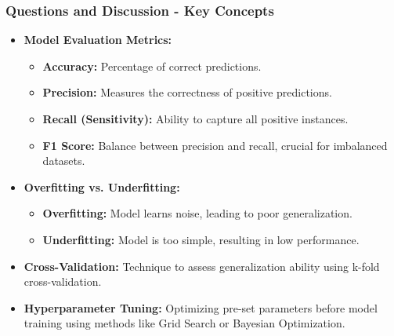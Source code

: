 \documentclass[aspectratio=169]{beamer}
\begin{document}
\begin{frame}[fragile]
  \frametitle{Questions and Discussion - Key Concepts}
  \begin{itemize}
    \item \textbf{Model Evaluation Metrics:}
      \begin{itemize}
        \item \textbf{Accuracy:} Percentage of correct predictions.
        \item \textbf{Precision:} Measures the correctness of positive predictions.
        \item \textbf{Recall (Sensitivity):} Ability to capture all positive instances.
        \item \textbf{F1 Score:} Balance between precision and recall, crucial for imbalanced datasets.
      \end{itemize}
  
    \item \textbf{Overfitting vs. Underfitting:}
      \begin{itemize}
        \item \textbf{Overfitting:} Model learns noise, leading to poor generalization.
        \item \textbf{Underfitting:} Model is too simple, resulting in low performance.
      \end{itemize}
  
    \item \textbf{Cross-Validation:} Technique to assess generalization ability using k-fold cross-validation.
  
    \item \textbf{Hyperparameter Tuning:} Optimizing pre-set parameters before model training using methods like Grid Search or Bayesian Optimization.
  \end{itemize}
\end{frame}
\end{document}
